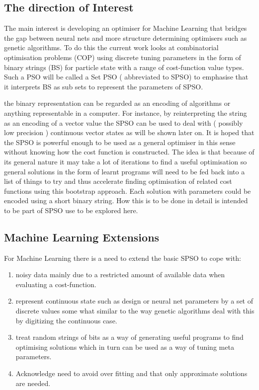 \documentclass[a4paper,oneside,english]{book}
\numberwithin{equation}{section}
\numberwithin{figure}{section}
\begin{document}
\subsection{The direction of Interest}
The main interest is developing an optimiser for Machine Learning that bridges the gap between neural nets and more structure determining optimisers such as genetic algorithms. To do this the current work looks at combinatorial optimisation problems (COP) using discrete tuning parameters in the form of binary strings (BS) for particle state with a range of cost-function value types. Such  a PSO will be called a Set PSO ( abbreviated to SPSO) to emphasise that it interprets BS as  sub sets to represent the parameters of SPSO. 

the binary representation can be regarded as an encoding of algorithms or anything representable in a computer. For instance, by reinterpreting the string as an encoding of a vector value the SPSO can be used to deal with  ( possibly low precision ) continuous vector states as will be shown later on. It is hoped that the SPSO is powerful enough to be used as a general optimiser in this sense without knowing how the cost function is constructed. The idea is that because of its general nature it may take a lot of iterations to find a useful optimisation so general solutions in the form of learnt programs will need to be fed back into a list of things to try and thus accelerate finding optimisation of related cost functions using this bootstrap approach. Each solution with parameters could be encoded using a short binary string. How this is to be done in detail is intended to be part of SPSO use to be explored here.

\subsection{Machine Learning Extensions }
For  Machine Learning there is a need to extend the basic SPSO to cope with:
\begin{enumerate}
	\item noisy data mainly due to a restricted amount of available data when evaluating a cost-function. 
	\item represent continuous state such as design or neural net parameters by a set of discrete values some what similar to the way genetic algorithms deal with this by digitizing the continuous case.
	\item treat random strings of bits as a way of generating useful programs  to find optimising solutions which in turn can be used as a way of tuning meta parameters.
	\item Acknowledge need to avoid over fitting and that only approximate solutions are needed. 
\end{enumerate}  
\end{document}
